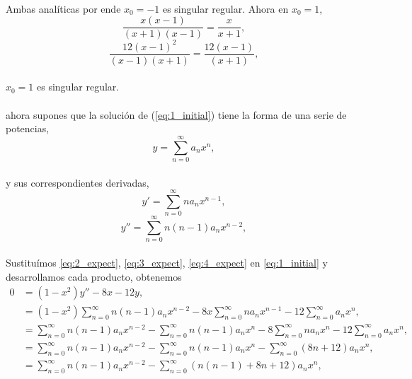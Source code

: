 \documentclass{article}
\begin{document}
\paragraph{} Ambas analíticas por ende $x_0 = -1$ es singular regular. Ahora en $x_0 = 1$,
$$\frac{x(x - 1)}{(x + 1)(x - 1)} = \frac{x}{x+1},$$
$$\frac{12(x-1)^2}{(x-1)(x+1)} = \frac{12(x-1)}{(x+1)},$$
\paragraph{} $x_0 = 1$ es singular regular.
\newpage
\paragraph{} ahora supones que la solución de (\ref{eq:1_initial}) tiene la forma de una serie de potencias,
\begin{equation}
y = \sum_{n=0}^{\infty} a_n x^n,\label{eq:2_expect}
\end{equation}
\paragraph{} y sus correspondientes derivadas,
\begin{equation}
y' = \sum_{n=0}^{\infty} na_n x^{n-1} \label{eq:3_expect},
\end{equation}
\begin{equation}
y'' = \sum_{n=0}^{\infty} n(n-1)a_n x^{n-2} \label{eq:4_expect},
\end{equation}
\paragraph{}Sustituímos \eqref{eq:2_expect}, \eqref{eq:3_expect}, \eqref{eq:4_expect} en \eqref{eq:1_initial} y desarrollamos cada producto, obtenemos
\begin{align*}
0 &= (1-x^2)y'' - 8x - 12y,\\
&= (1-x^2) \sum_{n=0}^{\infty} n(n-1)a_n x^{n-2} - 8x\sum_{n=0}^{\infty} na_n x^{n-1} - 12 \sum_{n=0}^{\infty} a_n x^n,\\
&= \sum_{n=0}^{\infty} n(n-1)a_n x^{n-2} - \sum_{n=0}^{\infty} n(n-1)a_n x^n - 8\sum_{n=0}^{\infty} na_n x^n - 12 \sum_{n=0}^{\infty} a_n x^n,\\
&= \sum_{n=0}^{\infty} n(n-1)a_n x^{n-2} - \sum_{n=0}^{\infty} n(n-1)a_n x^n - \sum_{n=0}^{\infty} (8n+12)a_nx^n,\\
&= \sum_{n=0}^{\infty} n(n-1)a_n x^{n-2} - \sum_{n=0}^{\infty} (n(n-1) + 8n + 12)a_nx^n,
\end{align*}
\end{document}
